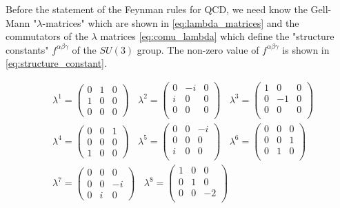 Before the statement of the Feynman rules for QCD, we need know the Gell-Mann "$\lambda$-matrices" which are shown in \ref{eq:lambda_matrices} and the commutators of the $\lambda$ matrices \ref{eq:comu_lambda} which define the "structure constants" $f^{\alpha\beta\gamma}$ of the $SU(3)$ group. The non-zero value of $f^{\alpha\beta\gamma}$ is shown in \ref{eq:structure_constant}.

\begin{equation}
\begin{split}
&\lambda^{1}=\begin{pmatrix} 0 & 1 & 0\\ 1 & 0 & 0 \\ 0 & 0 & 0 \end{pmatrix}~~~~\lambda^{2}=\begin{pmatrix} 0 & -i & 0 \\ i & 0 & 0 \\ 0 & 0 & 0 \\ \end{pmatrix}~~~~\lambda^{3}=\begin{pmatrix} 1&0&0 \\ 0&-1&0 \\ 0&0&0 \\ \end{pmatrix}\\
&\lambda^{4}=\begin{pmatrix} 0 & 0 & 1\\ 0 & 0 & 0 \\ 1 & 0 & 0 \end{pmatrix}~~~~\lambda^{5}=\begin{pmatrix} 0 & 0 & -i \\ 0 & 0 & 0 \\ i & 0 & 0 \\ \end{pmatrix}~~~~\lambda^{6}=\begin{pmatrix} 0&0&0 \\ 0&0&1 \\ 0&1&0 \\ \end{pmatrix}\\
&\lambda^{7}=\begin{pmatrix} 0 & 0 & 0\\ 0 & 0 & -i\\ 0 & i & 0 \end{pmatrix}~~~~\lambda^{8}=\begin{pmatrix} 1 & 0 & 0 \\ 0 & 1 & 0 \\ 0 & 0 & -2 \\ \end{pmatrix}
\end{split}
\label{eq:lambda_matrices}
\end{equation}

